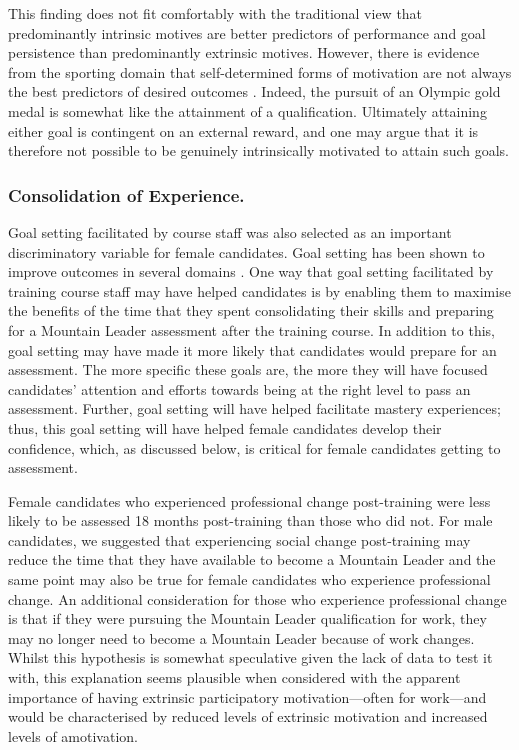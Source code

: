 \documentclass[
  12pt,
  a4paper,
]{book}
\begin{document}
This finding does not fit comfortably with the traditional view that predominantly intrinsic motives are better predictors of performance and goal persistence than predominantly extrinsic motives. However, there is evidence from the sporting domain that self-determined forms of motivation are not always the best predictors of desired outcomes \citep[e.g.,][]{Chantal1996, Fortier1995, Gullich2019, Hardy2017}. Indeed, the pursuit of an Olympic gold medal is somewhat like the attainment of a qualification. Ultimately attaining either goal is contingent on an external reward, and one may argue that it is therefore not possible to be genuinely intrinsically motivated to attain such goals.

\hypertarget{ml-pra-gta-female-consolidation-of-experience}{%
\subsubsection{Consolidation of Experience.}\label{ml-pra-gta-female-consolidation-of-experience}}

Goal setting facilitated by course staff was also selected as an important discriminatory variable for female candidates. Goal setting has been shown to improve outcomes in several domains \citep[see][ p 356]{Weinberg2014}. One way that goal setting facilitated by training course staff may have helped candidates is by enabling them to maximise the benefits of the time that they spent consolidating their skills and preparing for a Mountain Leader assessment after the training course. In addition to this, goal setting may have made it more likely that candidates would prepare for an assessment. The more specific these goals are, the more they will have focused candidates' attention and efforts towards being at the right level to pass an assessment. Further, goal setting will have helped facilitate mastery experiences; thus, this goal setting will have helped female candidates develop their confidence, which, as discussed below, is critical for female candidates getting to assessment.

Female candidates who experienced professional change post-training were less likely to be assessed 18 months post-training than those who did not. For male candidates, we suggested that experiencing social change post-training may reduce the time that they have available to become a Mountain Leader and the same point may also be true for female candidates who experience professional change. An additional consideration for those who experience professional change is that if they were pursuing the Mountain Leader qualification for work, they may no longer need to become a Mountain Leader because of work changes. Whilst this hypothesis is somewhat speculative given the lack of data to test it with, this explanation seems plausible when considered with the apparent importance of having extrinsic participatory motivation---often for work---and would be characterised by reduced levels of extrinsic motivation and increased levels of amotivation.
\end{document}
